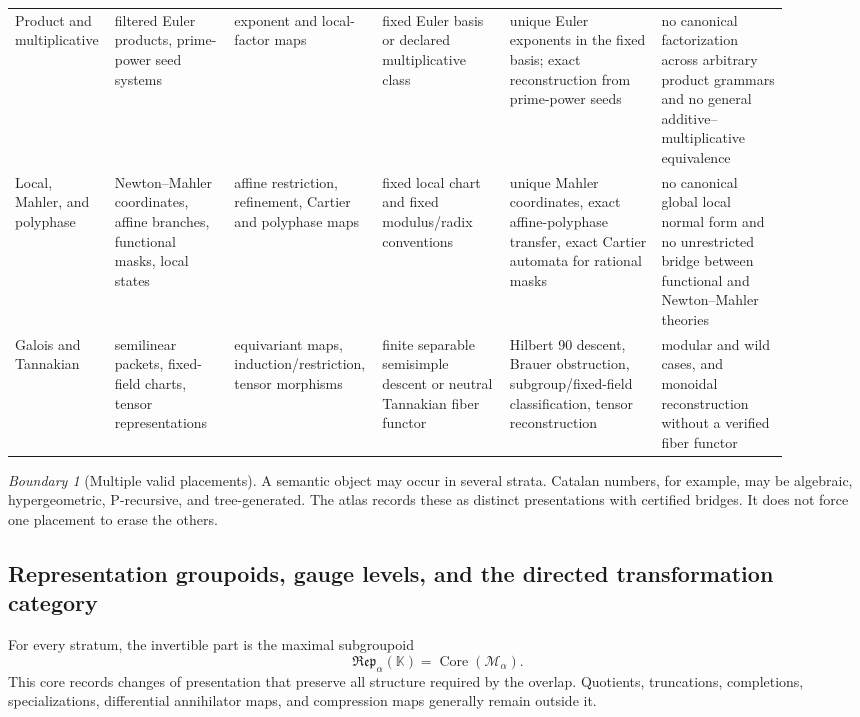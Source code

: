 \documentclass[11pt]{article}
\theoremstyle{definition}
\theoremstyle{remark}
\newtheorem{boundary}[theorem]{Boundary}
\DeclareMathOperator{\Core}{Core}
\newcommand{\bbK}{\mathbb K}
\begin{document}
\begin{landscape}
\begin{longtable}{@{}L{0.095\linewidth}L{0.15\linewidth}L{0.135\linewidth}L{0.165\linewidth}L{0.19\linewidth}L{0.165\linewidth}@{}}
Product and multiplicative & filtered Euler products, prime-power seed systems & exponent and local-factor maps & fixed Euler basis or declared multiplicative class & unique Euler exponents in the fixed basis; exact reconstruction from prime-power seeds & no canonical factorization across arbitrary product grammars and no general additive--multiplicative equivalence\\
Local, Mahler, and polyphase & Newton--Mahler coordinates, affine branches, functional masks, local states & affine restriction, refinement, Cartier and polyphase maps & fixed local chart and fixed modulus/radix conventions & unique Mahler coordinates, exact affine-polyphase transfer, exact Cartier automata for rational masks & no canonical global local normal form and no unrestricted bridge between functional and Newton--Mahler theories\\
Galois and Tannakian & semilinear packets, fixed-field charts, tensor representations & equivariant maps, induction/restriction, tensor morphisms & finite separable semisimple descent or neutral Tannakian fiber functor & Hilbert 90 descent, Brauer obstruction, subgroup/fixed-field classification, tensor reconstruction & modular and wild cases, and monoidal reconstruction without a verified fiber functor\\
\bottomrule
\end{longtable}
\end{landscape}

\begin{boundary}[Multiple valid placements]
\label{bnd:multiple-stratum-placements}
A semantic object may occur in several strata.  Catalan numbers, for example, may be algebraic, hypergeometric, P-recursive, and tree-generated.  The atlas records these as distinct presentations with certified bridges.  It does not force one placement to erase the others.
\end{boundary}

\subsection{Representation groupoids, gauge levels, and the directed transformation category}
\label{subsec:groupoid-directed}

For every stratum, the invertible part is the maximal subgroupoid
\[
\mathfrak{Rep}_\alpha(\bbK)
=
\Core(\mathcal M_\alpha).
\]
This core records changes of presentation that preserve all structure required by the overlap.  Quotients, truncations, completions, specializations, differential annihilator maps, and compression maps generally remain outside it.
\end{document}
